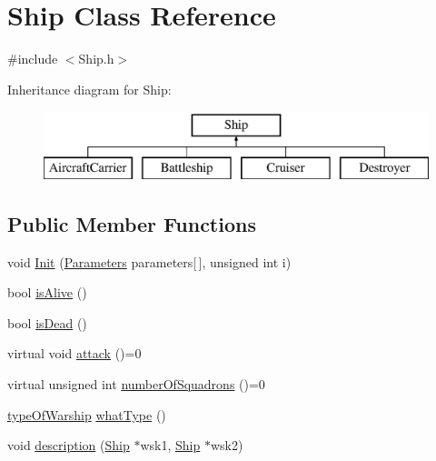 \hypertarget{class_ship}{}\section{Ship Class Reference}
\label{class_ship}


{\ttfamily \#include $<$Ship.\+h$>$}

Inheritance diagram for Ship\+:\begin{figure}[H]
\begin{center}
\leavevmode
\includegraphics[height=2.000000cm]{class_ship}
\end{center}
\end{figure}
\subsection*{Public Member Functions}
\begin{DoxyCompactItemize}
\item 
void \hyperlink{class_ship_ae1a95dbd2102b3d6e7781fc9fae2d8eb}{Init} (\hyperlink{struct_parameters}{Parameters} parameters\mbox{[}$\,$\mbox{]}, unsigned int i)
\item 
bool \hyperlink{class_ship_a82c8b196cb492da2ea377dc9188a426f}{is\+Alive} ()
\item 
bool \hyperlink{class_ship_aa4c8a05e575b32f70d99220de9c864a1}{is\+Dead} ()
\item 
virtual void \hyperlink{class_ship_a75d4d83e8f6bbaf06be9d1bf45c2bdd5}{attack} ()=0
\item 
virtual unsigned int \hyperlink{class_ship_abc3639e150f87a41a4ac1b770db7b56a}{number\+Of\+Squadrons} ()=0
\item 
\hyperlink{_functions_8h_ac7cd30cb79c1068579276e4cb287a2a7}{type\+Of\+Warship} \hyperlink{class_ship_a6636075f5ef1f6a2e0503f5ab370aead}{what\+Type} ()
\item 
void \hyperlink{class_ship_a8132d27eb12189d50da3c3eafdf159b5}{description} (\hyperlink{class_ship}{Ship} $\ast$wsk1, \hyperlink{class_ship}{Ship} $\ast$wsk2)
\end{DoxyCompactItemize}
